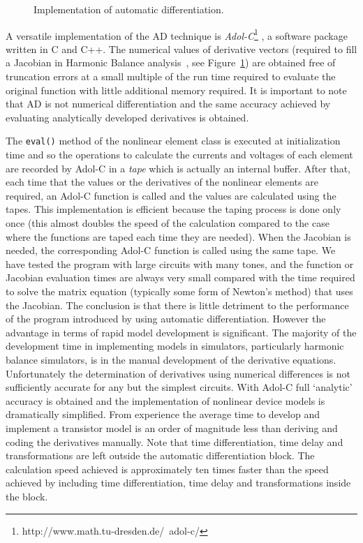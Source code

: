 %
\begin{figure}[htpb]
\leavevmode
\centerline{\epsfxsize=12cm }
\caption{Implementation of automatic differentiation.} \label{fig:adolc}
\end{figure}
%
A versatile implementation of the AD technique is
\emph{Adol-C}\footnote{http://www.math.tu-dresden.de/~adol-c/}
\cite{adol-c:96}, a software package written in C and C++.  The
numerical values of derivative vectors (required to fill a Jacobian in
Harmonic Balance analysis~\cite{svhb}, see Figure~\ref{fig:adolc}) are
obtained free of truncation errors at a small multiple of the run time
required to evaluate the original function with little additional
memory required.  It is important to note that AD is not numerical
differentiation and the same accuracy achieved by evaluating
analytically developed derivatives is obtained.

The {\tt eval()} method of the nonlinear element class is executed at
initialization time and so the operations to calculate the currents
and voltages of each element are recorded by Adol-C in a \emph{tape}
which is actually an internal buffer. After that, each time that the
values or the derivatives of the nonlinear elements are required, an
Adol-C function is called and the values are calculated using the
tapes.  This implementation is efficient because the taping process is
done only once (this almost doubles the speed of the calculation
compared to the case where the functions are taped each time they are
needed).  When the Jacobian is needed, the corresponding Adol-C
function is called using the same tape. We have tested the program
with large circuits with many tones, and the function or Jacobian
evaluation times are always very small compared with the time required
to solve the matrix equation (typically some form of Newton's method)
that uses the Jacobian. The conclusion is that there is little
detriment to the performance of the program introduced by using
automatic differentiation.  However the advantage in terms of rapid
model development is significant.  The majority of the development
time in implementing models in simulators, particularly harmonic
balance simulators, is in the manual development of the derivative
equations. Unfortunately the determination of derivatives using
numerical differences is not sufficiently accurate for any but the
simplest circuits. With Adol-C full `analytic' accuracy is obtained
and the implementation of nonlinear device models is dramatically
simplified. From experience the average time to develop and implement
a transistor model is an order of magnitude less than deriving and
coding the derivatives manually. Note that time differentiation, time
delay and transformations are left outside the automatic
differentiation block. The calculation speed achieved is approximately
ten times faster than the speed achieved by including time
differentiation, time delay and transformations inside the block.

